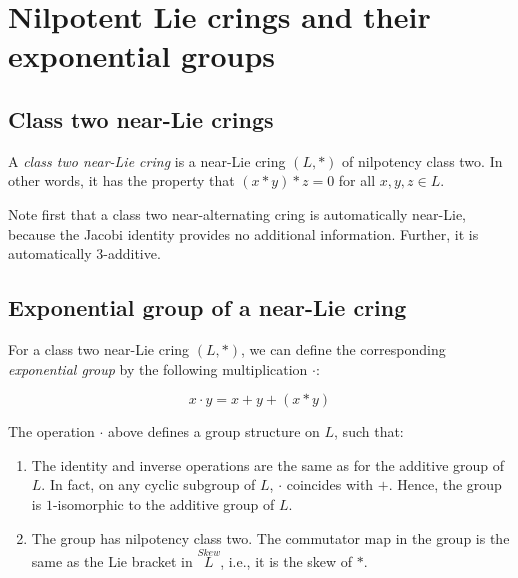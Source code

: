\documentclass[10pt]{amsart}
\begin{document}
\section{Nilpotent Lie crings and their exponential groups}

\subsection{Class two near-Lie crings}

A {\em class two near-Lie cring} is a near-Lie cring $(L,*)$ of
nilpotency class two. In other words, it has the property that $(x *
y) * z = 0$ for all $x,y,z \in L$. 

Note first that a class two near-alternating cring is
automatically near-Lie, because the Jacobi identity provides no
additional information. Further, it is automatically $3$-additive.

\subsection{Exponential group of a near-Lie cring}

For a class two near-Lie cring $(L,*)$, we can define the corresponding
{\em exponential group} by the following multiplication $\cdot$:

$$x \cdot y = x + y + (x * y)$$

\begin{lemma}
  The operation $\cdot$ above defines a group structure on $L$, such
  that:

  \begin{enumerate}
  \item The identity and inverse operations are the same as for the
    additive group of $L$. In fact, on any cyclic subgroup of $L$,
    $\cdot$ coincides with $+$. Hence, the group is $1$-isomorphic to
    the additive group of $L$.
  \item The group has nilpotency class two. The commutator map in the
    group is the same as the Lie bracket in $\stackrel{Skew}{L}$,
    i.e., it is the skew of $*$.
  \end{enumerate}
\end{lemma}
\end{document}
